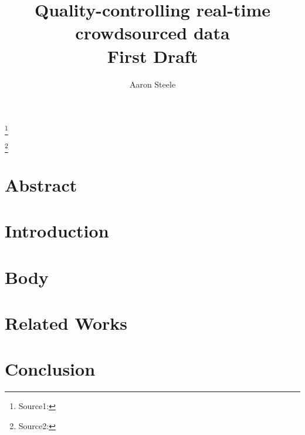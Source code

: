 \documentclass[12pt,twocolumn]{article}
\title{Quality-controlling real-time crowdsourced data \\ \large First Draft}
\author{Aaron Steele}
\date{}
\newcommand\blfootnote[1]{%
	\begingroup
	\renewcommand\thefootnote{}\footnote{#1}%
	\addtocounter{footnote}{-1}%
	\endgroup
}
\begin{document}
	\maketitle
	
	\blfootnote{Source1: }
	\blfootnote{Source2: }
	
	
	\section*{Abstract}
	
	\section*{Introduction}
	
	\section*{Body}
	
	\section*{Related Works}
	
	\section*{Conclusion}
\end{document}
